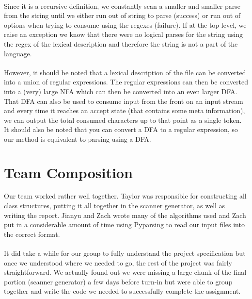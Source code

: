 \documentclass{article}
\begin{document}
\paragraph{} Since it is a recursive definition, we constantly scan a
smaller and smaller parse from the string until we either run out of
string to parse (success) or run out of options when trying to consume
using the regexes (failure). If at the top level, we raise an
exception we know that there were no logical parses for the string
using the regex of the lexical description and therefore the string is
not a part of the language.


\paragraph{} However, it should be noted that a lexical description
of the file can be converted into a union of regular expressions. The
regular expressions can then be converted into a (very) large NFA
which can then be converted into an even larger DFA. That DFA can also
be used to consume input from the front on an input stream and every
time it reaches an accept state (that contains some meta information),
we can output the total consumed characters up to that point as a
single token.  It should also be noted that you can convert a DFA to a
regular expression, so our method is equivalent to parsing using a
DFA.

\section{Team Composition}
\paragraph{}Our team worked rather well together. Taylor was 
responsible for constructing all class structures, putting it all
together in the scanner generator, as well as writing the
report. Jianyu and Zach wrote many of the algorithms used and Zach put
in a considerable amount of time using Pyparsing to read our input
files into the correct format.

\paragraph{}It did take a while for our group to fully understand the
project specification but once we understood where we needed to go,
the rest of the project was fairly straightforward. We actually found
out we were missing a large chunk of the final portion (scanner
generator) a few days before turn-in but were able to group together
and write the code we needed to successfully complete the assignment.
\end{document}
